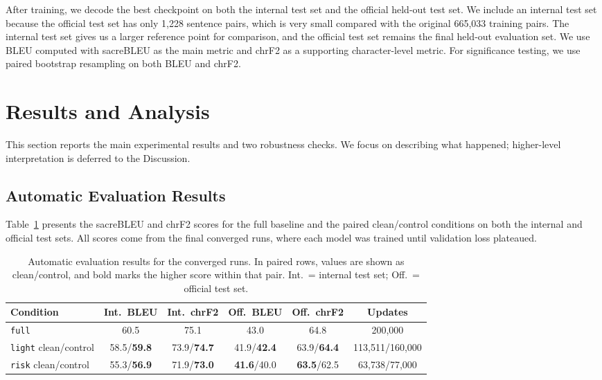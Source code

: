 \documentclass[11pt]{article}
\begin{document}
After training, we decode the best checkpoint on both the internal test set and the official held-out test set. We include an internal test set because the official test set has only 1,228 sentence pairs, which is very small compared with the original 665,033 training pairs. The internal test set gives us a larger reference point for comparison, and the official test set remains the final held-out evaluation set. We use BLEU computed with sacreBLEU as the main metric and chrF2 as a supporting character-level metric. For significance testing, we use paired bootstrap resampling on both BLEU and chrF2.

\section{Results and Analysis}

This section reports the main experimental results and two robustness checks. We focus on describing what happened; higher-level interpretation is deferred to the Discussion.

\subsection{Automatic Evaluation Results}

Table~\ref{tab:main-results} presents the sacreBLEU and chrF2 scores for the full baseline and the paired clean/control conditions on both the internal and official test sets. All scores come from the final converged runs, where each model was trained until validation loss plateaued.

\begin{table}[ht]
\centering
\small
\begin{tabular}{lccccc}
\toprule
\textbf{Condition} & \textbf{Int.\ BLEU} & \textbf{Int.\ chrF2} & \textbf{Off.\ BLEU} & \textbf{Off.\ chrF2} & \textbf{Updates} \\
\midrule
\texttt{full} & 60.5 & 75.1 & 43.0 & 64.8 & 200,000 \\
\texttt{light} clean/control & 58.5/\textbf{59.8} & 73.9/\textbf{74.7} & 41.9/\textbf{42.4} & 63.9/\textbf{64.4} & 113,511/160,000 \\
\texttt{risk} clean/control & 55.3/\textbf{56.9} & 71.9/\textbf{73.0} & \textbf{41.6}/40.0 & \textbf{63.5}/62.5 & 63,738/77,000 \\
\bottomrule
\end{tabular}
\caption{Automatic evaluation results for the converged runs. In paired rows, values are shown as clean/control, and bold marks the higher score within that pair. Int.\ = internal test set; Off.\ = official test set.}
\label{tab:main-results}
\end{table}
\end{document}
